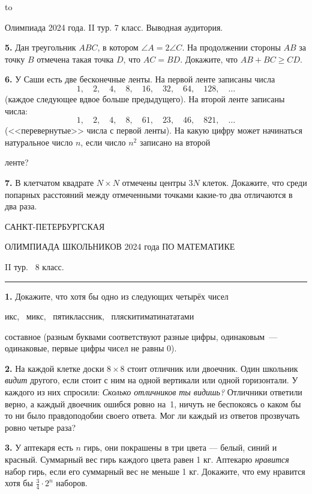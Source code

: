 \documentclass[12pt]{article}
\def\q#1.{{\bf #1. }}
\def\dotline{\smallskip\hbox to \hsize{\dotfill}\medskip}
\begin{document}
\dotline

\centerline{Олимпиада 2024 года. II тур. 7 класс. Выводная аудитория.}
\smallskip

\q5. Дан треугольник $ABC$, в котором $\angle A = 2 \angle C$. На продолжении стороны $AB$ за точку $B$ отмечена такая точка $D$, что $AC = BD$. Докажите, что $AB + BC \geqslant CD$.

\q6. У Саши есть две бесконечные ленты. На первой ленте записаны числа 
$$
1, \quad 2, \quad 4, \quad 8, \quad 16, \quad 32, \quad 64, \quad 128, \quad \ldots
$$
(каждое следующее вдвое больше предыдущего). На второй ленте записаны числа: 
$$
1, \quad 2, \quad 4, \quad 8, \quad 61, \quad 23, \quad 46, \quad 821, \quad \ldots
$$
(<<перевернутые>> числа с первой ленты). На какую цифру может начинаться натуральное число $n$, если число $n^2$ записано на второй {ленте?\parfillskip=0pt\par}

\q7. В клетчатом квадрате $N \times N$ отмечены центры $3N$ клеток. Докажите, что среди попарных расстояний между отмеченными точками какие-то два отличаются в два раза.


\clearpage

\centerline{\sc САНКТ-ПЕТЕРБУРГСКАЯ}
\centerline{\sc ОЛИМПИАДА ШКОЛЬНИКОВ 2024 года ПО МАТЕМАТИКЕ}
\centerline{\sc II тур. \ 8 класс.}
\medskip
\hrule
\bigskip

\q1. Докажите, что хотя бы одно из следующих четырёх чисел 
\begin{center}
{\sc  икс, \ микс, \ пятиклассник, \ пляскитиматинататами}
\end{center}
составное (разным буквами соответствуют разные цифры, 
одинаковым~--- одинаковые, первые цифры чисел не равны 0). 

\q2. На каждой клетке доски $8\times 8$ стоит отличник или двоечник. Один школьник \emph{видит} другого, если стоит с ним на одной вертикали или одной горизонтали. У каждого из них спросили: \emph{Сколько отличников ты видишь?} Отличники ответили верно, а каждый двоечник ошибся ровно на~1, ничуть не беспокоясь о каком бы то ни было 
правдоподобии своего ответа. Мог ли каждый из ответов прозвучать ровно четыре раза?

\q3. У аптекаря есть $n$ гирь, они покрашены в три цвета --- белый, синий и красный. 
Суммарный вес гирь каждого цвета равен 1 кг. %
Аптекарю \emph{нравится} набор гирь, если его суммарный вес не меньше 1 кг. %
Докажите, что ему нравится хотя бы $\frac34\cdot 2^n$ наборов. %
\end{document}
